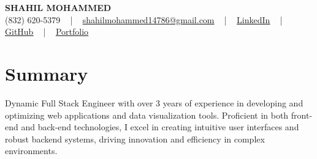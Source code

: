 \documentclass[letterpaper,10pt]{article}
\begin{document}
\begin{center}
    {\fontsize{14pt}{12pt}\selectfont \textbf{\MakeUppercase{Shahil Mohammed}}}\\ \vspace{2pt}
    \fontsize{10pt}{12pt}\selectfont (832) 620-5379 ~ | ~ \href{mailto:shahilmohammed14786@gmail.com}{shahilmohammed14786@gmail.com} ~ | ~  
    \href{https://www.linkedin.com/in/shahil-mohammed-9652931a1/}{\color{blue}\underline{LinkedIn}}  ~ | ~ 
    \href{https://github.com/freakbeast14}{\color{blue}\underline{GitHub}} ~ | ~ 
    \href{https://shahil-mohammed.netlify.app/}{\color{blue}\underline{Portfolio}}
    \vspace{-8pt}
\end{center}

\section{Summary}
\vspace{-2pt}\fontsize{8pt}{9pt}\selectfont
Dynamic Full Stack Engineer with over 3 years of experience in developing and optimizing web applications and data visualization tools. Proficient in both front-end and back-end technologies, I excel in creating intuitive user interfaces and robust backend systems, driving innovation and efficiency in complex environments.
 \vspace{-5pt}
 
\vspace{-2pt}
\end{document}
